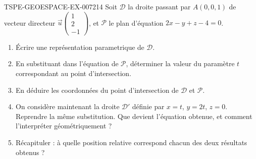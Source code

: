 \begin{exercice}{TSPE-GEOESPACE-EX-007}{2}{14}
Soit $\mathcal{D}$ la droite passant par $A(0,0,1)$ de vecteur directeur $\vec{u}\begin{pmatrix}1\\2\\-1\end{pmatrix}$, et $\mathcal{P}$ le plan d'équation $2x-y+z-4=0$.
\begin{enumerate}
  \item Écrire une représentation parametrique de $\mathcal{D}$.
  \item En substituant dans l'équation de $\mathcal{P}$, déterminer la valeur du paramètre $t$ correspondant au point d'intersection.
  \item En déduire les coordonnées du point d'intersection de $\mathcal{D}$ et $\mathcal{P}$.
  \item On considère maintenant la droite $\mathcal{D}'$ définie par $x=t$,
        $y=2t$, $z=0$. Reprendre la même substitution. Que devient l'équation
        obtenue, et comment l'interpréter géométriquement ?
  \item Récapituler : à quelle position relative correspond chacun des deux
        résultats obtenus ?
\end{enumerate}
\end{exercice}
